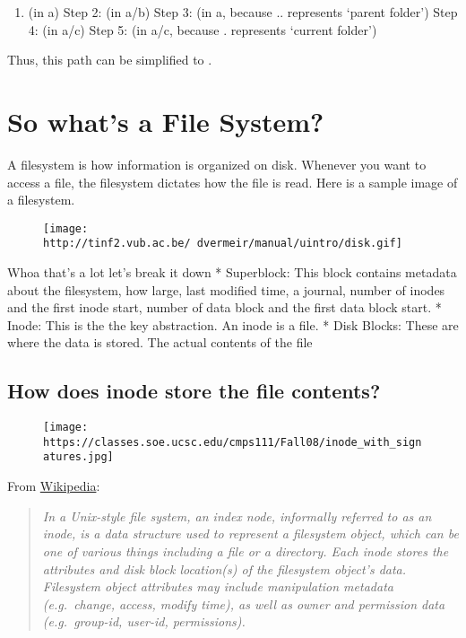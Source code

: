 \begin{enumerate}
  \item {} (in a) 
  Step 2:  (in a/b)
  Step 3:  (in a, because .. represents `parent folder')
  Step 4:  (in a/c)
  Step 5:  (in a/c, because . represents `current folder')
\end{enumerate}

Thus, this path can be simplified to .

\section{So what's a File System?}\label{so-whats-a-file-system}

A filesystem is how information is organized on disk. Whenever you want to access a file, the filesystem dictates how the file is read. Here is a sample image of a filesystem.

\begin{figure}[htbp]
\centering
\texttt{[image: http://tinf2.vub.ac.be/~dvermeir/manual/uintro/disk.gif]}
\caption{}
\end{figure}

Whoa that's a lot let's break it down * Superblock: This block contains metadata about the filesystem, how large, last modified time, a journal, number of inodes and the first inode start, number of data block and the first data block start. * Inode: This is the the key abstraction. An inode is a file. * Disk Blocks: These are where the data is stored. The actual contents of the file

\subsection{How does inode store the file contents?}\label{how-does-inode-store-the-file-contents}

\begin{figure}[htbp]
\centering
\texttt{[image: https://classes.soe.ucsc.edu/cmps111/Fall08/inode\_with\_signatures.jpg]}
\caption{}
\end{figure}

From \href{http://en.wikipedia.org/wiki/Inode}{Wikipedia}:

\begin{quote}
\emph{In a Unix-style file system, an index node, informally referred to as an inode, is a data structure used to represent a filesystem object, which can be one of various things including a file or a directory. Each inode stores the attributes and disk block location(s) of the filesystem object's data. Filesystem object attributes may include manipulation metadata (e.g.~change, access, modify time), as well as owner and permission data (e.g.~group-id, user-id, permissions).}
\end{quote}

